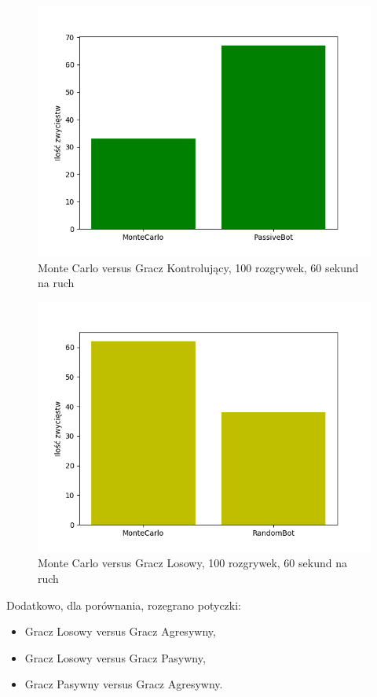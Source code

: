\documentclass[a4paper, 12pt]{article}
\begin{document}
\begin{figure}[H]
	\centering
	\includegraphics[scale=0.75]{60-100_p_vs_m.png}
	\caption{Monte Carlo versus Gracz Kontrolujący, 100 rozgrywek, 60 sekund na ruch}
\end{figure}

\begin{figure}[H]
	\centering
	\includegraphics[scale=0.75]{60-100_r_vs_m.png}
	\caption{Monte Carlo versus Gracz Losowy, 100 rozgrywek, 60 sekund na ruch}
\end{figure}

Dodatkowo, dla porównania, rozegrano potyczki:
\begin{itemize}
\item Gracz Losowy versus Gracz Agresywny,
\item Gracz Losowy versus Gracz Pasywny,
\item Gracz Pasywny versus Gracz Agresywny.
\end{itemize}
\end{document}
